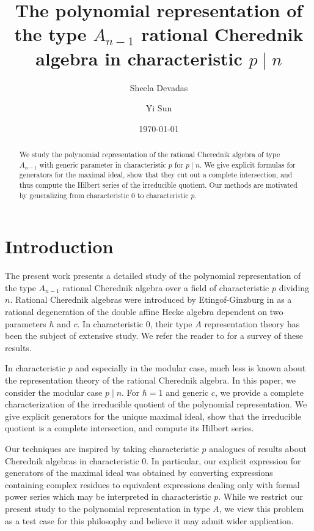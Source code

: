 \documentclass{amsart}
\numberwithin{equation}{section}
\theoremstyle{definition}
\begin{document}
\title[Polynomial representation of type $A_{n - 1}$ rational Cherednik algebra in characteristic $p \mid n$]{The polynomial representation of the type $A_{n - 1}$ rational Cherednik algebra in characteristic $p \mid n$}
\author{Sheela Devadas}
\author{Yi Sun}
\date{\today}

\begin{abstract}
We study the polynomial representation of the rational Cherednik algebra of type $A_{n-1}$ with generic parameter in characteristic $p$ for $p \mid n$. We give explicit formulas for generators for the maximal ideal, show that they cut out a complete intersection, and thus compute the Hilbert series of the irreducible quotient. Our methods are motivated by generalizing from characteristic $0$ to characteristic $p$. 
\end{abstract}

\maketitle

\section{Introduction}

The present work presents a detailed study of the polynomial representation of the type $A_{n - 1}$ rational Cherednik algebra over a field of characteristic $p$ dividing $n$.  Rational Cherednik algebras were introduced by Etingof-Ginzburg in \cite{EG} as a rational degeneration of the double affine Hecke algebra dependent on two parameters $\hbar$ and $c$.  In characteristic $0$, their type $A$ representation theory has been the subject of extensive study.  We refer the reader to \cite{EM} for a survey of these results. 

In characteristic $p$ and especially in the modular case, much less is known about the representation theory of the rational Cherednik algebra.  In this paper, we consider the modular case $p \mid n$.  For $\hbar = 1$ and generic $c$, we provide a complete characterization of the irreducible quotient of the polynomial representation.  We give explicit generators for the unique maximal ideal, show that the irreducible quotient is a complete intersection, and compute its Hilbert series.

Our techniques are inspired by taking characteristic $p$ analogues of results about Cherednik algebras in characteristic $0$.  In particular, our explicit expression for generators of the maximal ideal was obtained by converting expressions containing complex residues to equivalent expressions dealing only with formal power series which may be interpreted in characteristic $p$.  While we restrict our present study to the polynomial representation in type $A$, we view this problem as a test case for this philosophy and believe it may admit wider application.
\end{document}
